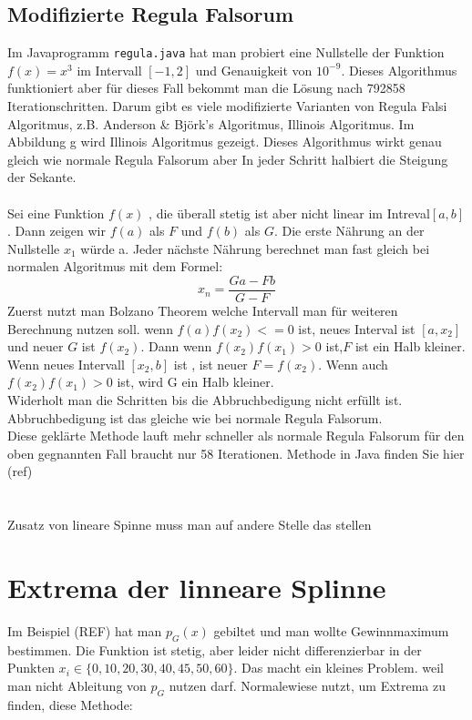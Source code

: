 \subsection{Modifizierte Regula Falsorum}
Im Javaprogramm \verb|regula.java| hat man probiert eine Nullstelle der Funktion $f(x) = x^3$ im Intervall  $[-1,2]$ und Genauigkeit von $10^{-9}$. Dieses Algorithmus funktioniert aber für dieses Fall bekommt man die Lösung nach 792858 Iterationschritten.
Darum gibt es viele modifizierte Varianten von Regula Falsi Algoritmus, z.B. Anderson \& Björk's Algoritmus, Illinois Algoritmus.
Im Abbildung g wird Illinois Algoritmus gezeigt.
Dieses Algorithmus wirkt genau gleich wie normale Regula Falsorum aber In jeder Schritt halbiert die Steigung der Sekante.\\
\\Sei eine Funktion $f(x)$ , die überall stetig ist aber nicht linear im Intreval$[a,b]$. Dann zeigen wir $f(a)$ als $F$ und $f(b)$ als $G$.
Die erste Nährung an der Nullstelle $x_1$ würde a.
Jeder nächste Nährung berechnet man fast gleich bei normalen Algoritmus mit dem Formel:
\begin{equation}
x_n =\frac{Ga - Fb}{G-F}
\end{equation}
Zuerst nutzt man Bolzano Theorem welche Intervall  man  für weiteren Berechnung nutzen soll. wenn $f(a)f(x_2)<=0$ ist, neues Interval ist $[a,x_2]$ und neuer $G$ ist $f(x_2)$. Dann wenn $f(x_2)f(x_1) >0$ ist,$ F$ ist ein Halb kleiner.
Wenn neues Intervall $[x_2,b]$ ist , ist neuer $F = f(x_2)$. Wenn auch$ f(x_2)f(x_1)>0$ ist, wird G ein Halb kleiner.\\
Widerholt man die Schritten bis die Abbruchbedigung nicht erfüllt ist. Abbruchbedigung ist das gleiche wie bei normale Regula Falsorum.\\
Diese geklärte Methode lauft mehr schneller als normale Regula Falsorum für den oben gegnannten Fall braucht nur 58 Iterationen.
Methode in Java finden Sie hier (ref)
\\
\\
\\
Zusatz von lineare Spinne  muss man auf andere Stelle das stellen

\section{Extrema der linneare Splinne}
Im Beispiel (REF) hat man $p_G(x)$ gebiltet und man wollte Gewinnmaximum bestimmen. Die Funktion ist stetig, aber leider nicht differenzierbar in der Punkten $ x_i \in \{0, 10, 20 ,30 ,40 ,45 ,50, 60 \}$.
Das macht ein kleines Problem. weil man nicht Ableitung von $p_G$ nutzen darf.
Normalewiese nutzt, um Extrema zu finden, diese Methode:

